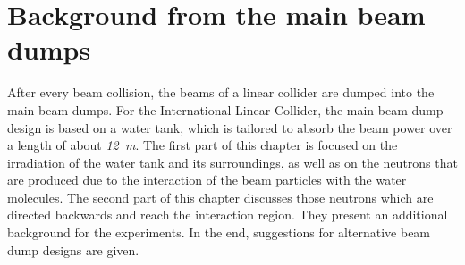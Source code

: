 \chapter{Background from the main beam dumps}
\label{BeamDumps}

\begin{chapterabstract}
 After every beam collision, the beams of a linear collider are dumped into the main beam dumps.
 For the International Linear Collider, the main beam dump design is based on a water tank, which is tailored to absorb the beam power over a length of about \textit{\SI[detect-all]{12}{\meter}}.
 The first part of this chapter is focused on the irradiation of the water tank and its surroundings, as well as on the neutrons that are produced due to the interaction of the beam particles with the water molecules.
 The second part of this chapter discusses those neutrons which are directed backwards and reach the interaction region.
 They present an additional background for the experiments.
 In the end, suggestions for alternative beam dump designs are given.
\end{chapterabstract}


